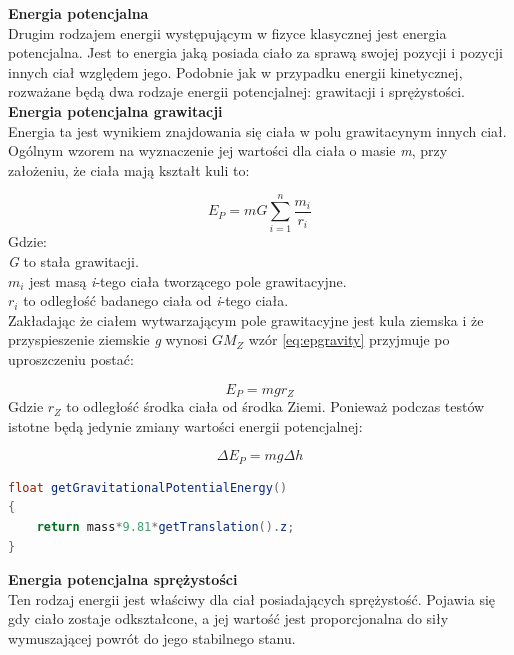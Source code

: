 \textbf{Energia potencjalna}\\
Drugim rodzajem energii występującym w fizyce klasycznej jest energia
potencjalna. Jest to energia jaką posiada ciało za sprawą swojej pozycji i
pozycji innych ciał względem jego. Podobnie jak w przypadku energii
kinetycznej, rozważane będą dwa rodzaje energii potencjalnej: grawitacji i
sprężystości.\\

\textbf{Energia potencjalna grawitacji}\\
Energia ta jest wynikiem znajdowania się ciała w polu grawitacynym innych ciał.
Ogólnym wzorem na wyznaczenie jej wartości dla ciała o masie \emph{m}, przy
założeniu, że ciała mają kształt kuli to:

\begin{equation}
E_{P} = mG\sum_{i=1}^{n}\frac{m_{i}}{r_{i}}
\label{eq:epgravity}
\end{equation}
Gdzie:\\
\emph{G} to stała grawitacji.\\
$ m_{i} $ jest masą \emph{i}-tego ciała tworzącego pole grawitacyjne.\\
$ r_{i} $ to odległość badanego ciała od \emph{i}-tego ciała.\\

Zakładając że ciałem wytwarzającym pole grawitacyjne jest kula ziemska i że
przyspieszenie ziemskie \emph{g} wynosi $ GM_{Z} $ wzór
\ref{eq:epgravity} przyjmuje po uproszczeniu postać:

\begin{equation}
E_{P} = mgr_{Z}
\end{equation}
Gdzie $ r_{Z} $ to odległość środka ciała od środka Ziemi. Ponieważ podczas
testów istotne będą jedynie zmiany wartości energii potencjalnej:

\begin{equation}
\Delta E_{P} = mg\Delta h
\end{equation}

\begin{lstlisting}[language=Java,
caption=fragment pliku CollisionShape.java,label=lis:epgravity]
float getGravitationalPotentialEnergy()
{
	return mass*9.81*getTranslation().z;
}
\end{lstlisting}

\textbf{Energia potencjalna sprężystości}\\
Ten rodzaj energii jest właściwy dla ciał posiadających sprężystość. Pojawia się
gdy ciało zostaje odkształcone, a jej wartość jest proporcjonalna do siły
wymuszającej powrót do jego stabilnego stanu.


